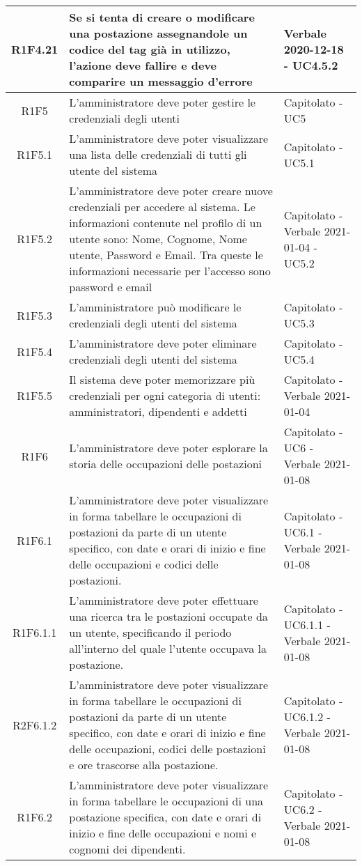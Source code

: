 \begin{center}
\begin{longtable}{|c|p{10cm}|p{4cm}|}
			R1F4.21&Se si tenta di creare o modificare una postazione assegnandole un codice del tag già in utilizzo, l'azione deve fallire e deve comparire un messaggio d'errore	&Verbale 2020-12-18 - UC4.5.2 	\\
					\hline
			R1F5&L'amministratore deve poter gestire le credenziali degli utenti	& Capitolato - UC5		\\
					\hline
R1F5.1&L'amministratore deve poter visualizzare una lista delle credenziali di tutti gli utente del sistema	& Capitolato - UC5.1	\\
					\hline
R1F5.2&L'amministratore deve poter creare nuove credenziali per accedere al sistema. Le informazioni contenute nel profilo di un utente sono: Nome, Cognome, Nome utente, Password e Email. Tra queste le informazioni necessarie per l'accesso sono password e email	& Capitolato - Verbale 2021-01-04 - UC5.2	\\
						\hline
			R1F5.3&L'amministratore può modificare le credenziali degli utenti del sistema	&Capitolato - UC5.3 	\\
					\hline
			R1F5.4&L'amministratore deve poter eliminare credenziali degli utenti del sistema	& Capitolato - UC5.4	\\
					\hline
R1F5.5&Il sistema deve poter memorizzare più credenziali per ogni categoria di utenti: amministratori, dipendenti e addetti	& Capitolato - Verbale 2021-01-04	\\
					\hline
R1F6&L'amministratore deve poter esplorare la storia delle occupazioni delle postazioni	& Capitolato - UC6 - Verbale 2021-01-08	\\
						\hline
			R1F6.1&L'amministratore deve poter visualizzare in forma tabellare le occupazioni di postazioni da parte di un utente specifico, con date e orari di inizio e fine delle occupazioni e codici delle postazioni.	&Capitolato - UC6.1 - Verbale 2021-01-08	\\
					\hline
			R1F6.1.1&L'amministratore deve poter effettuare una ricerca tra le postazioni occupate da un utente, specificando il periodo all'interno del quale l'utente occupava la postazione. & 	Capitolato - UC6.1.1 - Verbale 2021-01-08\\
					\hline
			R2F6.1.2&L'amministratore deve poter visualizzare in forma tabellare le occupazioni di postazioni da parte di un utente specifico, con date e orari di inizio e fine delle occupazioni,  codici delle postazioni e ore trascorse alla postazione. & 	Capitolato - UC6.1.2 - Verbale 2021-01-08\\
			\hline
			R1F6.2&L'amministratore deve poter visualizzare in forma tabellare le occupazioni di una postazione specifica, con date e orari di inizio e fine delle occupazioni e nomi e cognomi dei dipendenti.	&Capitolato - UC6.2 - Verbale 2021-01-08	\\

\end{longtable}
\end{center}
